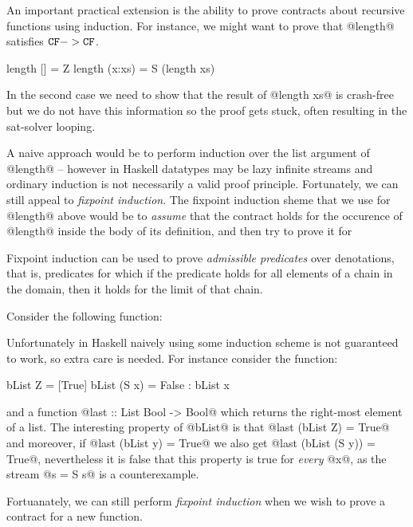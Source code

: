 \label{sect:induction}

An important practical extension is the ability to prove contracts about recursive functions
using induction. For instance, we might want to prove that @length@ satisfies ${\tt CF} -> {\tt CF}$.
\begin{code}
length [] = Z 
length (x:xs) = S (length xs)
\end{code}
In the second case we need to show that the result of @length xs@ is crash-free but we do not 
have this information so the proof gets stuck, often resulting in the sat-solver looping. 

A naive approach would be to perform induction over the list argument of @length@ -- however
in Haskell datatypes may be lazy infinite streams and ordinary induction is not necessarily 
a valid proof principle. Fortunately, we can still appeal to {\em fixpoint induction}. The 
fixpoint induction sheme that we use for @length@ above would be to {\em assume} that the 
contract holds for the occurence of @length@ inside the body of its definition, and then 
try to prove it for 




Fixpoint induction can be used to prove {\em admissible predicates} over denotations, 
that is, predicates for which if the predicate holds for all elements of a chain in
the domain, then it holds for the limit of that chain. 





Consider the following function: 


Unfortunately in 
Haskell naively using some induction scheme is not guaranteed to work, so extra care is needed. For
instance consider the function:
\begin{code}
 bList Z = [True]
 bList (S x) = False : bList x
\end{code}
and a function @last :: List Bool -> Bool@ which returns the right-most element of a list.
The interesting property of @bList@ is that @last (bList Z) = True@ and moreover, if 
@last (bList y) = True@ we also get @last (bList (S y)) = True@, nevertheless it is 
false that this property is true for {\em every} @x@, as the stream @s = S s@ is a 
counterexample.

Fortuanately, we can still perform {\em fixpoint induction} when we wish to prove a contract
for a new function. 

